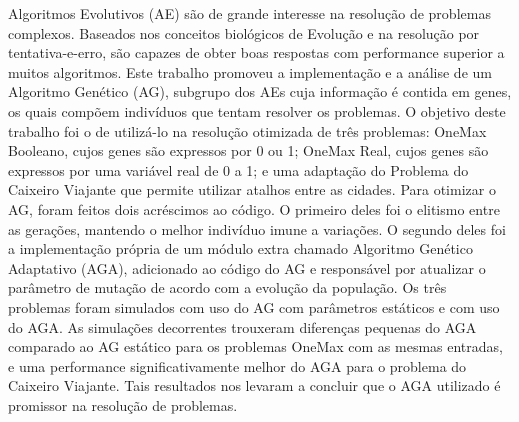 Algoritmos Evolutivos (AE) são de grande interesse na resolução de problemas complexos. Baseados nos conceitos biológicos de Evolução e na resolução por tentativa-e-erro, são capazes de obter boas respostas com performance superior a muitos algoritmos. Este trabalho promoveu a implementação e a análise de um Algoritmo Genético (AG), subgrupo dos AEs cuja informação é contida em genes, os quais compõem indivíduos que tentam resolver os problemas. O objetivo deste trabalho foi o de utilizá-lo na resolução otimizada de três problemas: OneMax Booleano, cujos genes são expressos por 0 ou 1; OneMax Real, cujos genes são expressos por uma variável real de 0 a 1; e uma adaptação do Problema do Caixeiro Viajante que permite utilizar atalhos entre as cidades. Para otimizar o AG, foram feitos dois acréscimos ao código. O primeiro deles foi o elitismo entre as gerações, mantendo o melhor indivíduo imune a variações. O segundo deles foi a implementação própria de um módulo extra chamado Algoritmo Genético Adaptativo (AGA), adicionado ao código do AG e responsável por atualizar o parâmetro de mutação de acordo com a evolução da população. Os três problemas foram simulados com uso do AG com parâmetros estáticos e com uso do AGA. As simulações decorrentes trouxeram diferenças pequenas do AGA comparado ao AG estático para os problemas OneMax com as mesmas entradas, e uma performance significativamente melhor do AGA para o problema do Caixeiro Viajante. Tais resultados nos levaram a concluir que o AGA utilizado é promissor na resolução de problemas.